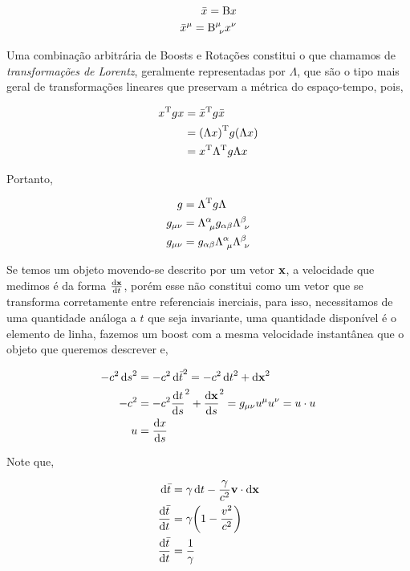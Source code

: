 \documentclass[twoside]{amsart}
\numberwithin{equation}{section}
\begin{document}
\begin{align}
    \bar x={\textup B} x\\
    {\bar x}^\mu={\textup B}^\mu_{\ \nu}x^\nu
\end{align}

Uma combinação arbitrária de Boosts e Rotações constitui o que chamamos de \emph{transformações de Lorentz}, geralmente representadas por $\Lambda$, que são o tipo mais geral de transformações lineares que preservam a métrica do espaço-tempo, pois,

\begin{align}
    x^{\textup T}g x&={\bar x}^{\textup T}g{\bar x}\\
    &=\qty(\Lambda x)^{\textup T}g\qty(\Lambda x)\\
    &=x^{\textup T}\Lambda^{\textup T}g\Lambda x
\end{align}

Portanto,

\begin{align}
    g&=\Lambda^{\textup T}g\Lambda\\
    g_{\mu\nu}&=\Lambda^\alpha_{\ \mu}g_{\alpha\beta}\Lambda^\beta_{\ \nu}\\
    g_{\mu\nu}&=g_{\alpha\beta}\Lambda^\alpha_{\ \mu}\Lambda^\beta_{\ \nu}
\end{align}

Se temos um objeto movendo-se descrito por um vetor $\vb x$, a velocidade que medimos é da forma $\dv{\vb x}{t}$, porém esse não constitui como um vetor que se transforma corretamente entre referenciais inerciais, para isso, necessitamos de uma quantidade análoga a $t$ que seja invariante, uma quantidade disponível é o elemento de linha, fazemos um boost com a mesma velocidade instantânea que o objeto que queremos descrever e,

\begin{align}
    -c^2\dd{s}^2&=-c^2\dd{{\bar t}}^2=-c^2\dd{t}^2+\dd{\vb x}^2\\
    -c^2&=-c^2\dv{t}{s}^2+\dv{\vb x}{s}^2=g_{\mu\nu}u^\mu u^\nu=u\cdot u\\
    u&=\dv{x}{s}
\end{align}

Note que,

\begin{align}
    \dd{{\bar t}}&=\gamma\dd{t}-\frac{\gamma}{c^2}\vb v\cdot \dd{\vb x}\\
    \dv{{\bar t}}{t}&=\gamma\qty(1-\frac{v^2}{c^2})\\
    \dv{{\bar t}}{t}&=\frac{1}{\gamma}
\end{align}
\end{document}
